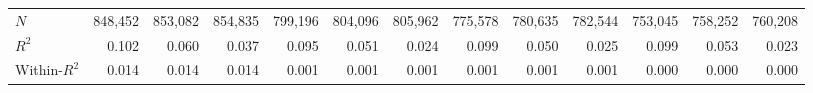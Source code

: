 \begin{tabular}{lrrrrrrrrrrrr}
\midrule
$N$                                         &      848,452 &      853,082 &      854,835 &      799,196 &      804,096 &      805,962 &      775,578 &      780,635 &      782,544 &      753,045 &      758,252 &      760,208 \\ 
$R^2$                                       &        0.102 &        0.060 &        0.037 &        0.095 &        0.051 &        0.024 &        0.099 &        0.050 &        0.025 &        0.099 &        0.053 &        0.023 \\ 
Within-$R^2$                                &        0.014 &        0.014 &        0.014 &        0.001 &        0.001 &        0.001 &        0.001 &        0.001 &        0.001 &        0.000 &        0.000 &        0.000 \\ 
\bottomrule
\end{tabular}
